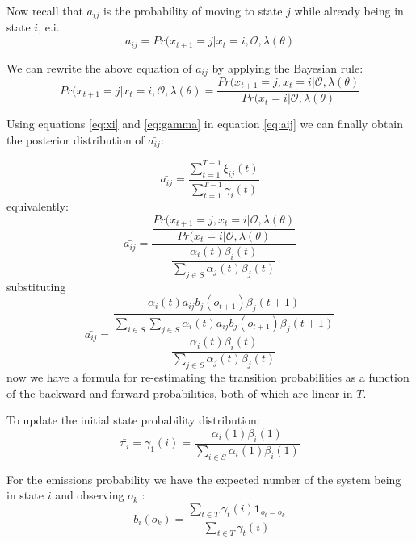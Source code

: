 \documentclass[a4paper,12pt]{article}
\theoremstyle{definition}
\begin{document}
Now recall that $a_{ij}$ is the probability of moving to state $j$ while already being in state $i$, e.i. 
\begin{equation}
a_{ij}= Pr(x_{t+1}=j|x_t=i, \mathcal{O}, \lambda(\theta)
\end{equation}


We can rewrite the above equation of $a_{ij}$  by applying the Bayesian rule:
\begin{equation}\label{eq:aij}
Pr(x_{t+1}=j|x_t=i, \mathcal{O}, \lambda(\theta) = \frac{Pr(x_{t+1}=j,x_t=i| \mathcal{O}, \lambda(\theta)}{Pr(x_t=i | \mathcal{O}, \lambda(\theta)}
\end{equation}

Using equations \ref{eq:xi} and \ref{eq:gamma} in equation \ref{eq:aij} we can finally obtain the posterior distribution of $\bar{a_{ij}}$:

\begin{equation}
\bar{a_{ij}} = \frac{\sum_{t=1}^{T-1}\xi_{ij}(t)}{\sum_{t=1}^{T-1} \gamma_i(t)} 
\end{equation}
equivalently:
\begin{equation}
\bar{a_{ij}} = \dfrac{\dfrac{Pr(x_{t+1}=j,x_t=i| \mathcal{O}, \lambda(\theta)}{Pr(x_t=i | \mathcal{O}, \lambda(\theta)}}
		 {\dfrac{\alpha_i(t) \beta_i(t)}{\sum_{j \in S}\alpha_j(t) \beta_j(t) }}
\end{equation}
substituting 
\begin{equation}
\bar{a_{ij}} = \dfrac{  \dfrac{\alpha_i(t) a_{ij} b_j(o_{t+1}) \beta_j(t+1)}
					{\sum_{i\in S}\sum_{j\in S} \alpha_i(t) a_{ij} b_j(o_{t+1}) \beta_j(t+1) }}
					{\dfrac{\alpha_i(t) \beta_i(t)}{\sum_{j \in S}\alpha_j(t) \beta_j(t) }}
\end{equation}
now we have a formula for re-estimating the transition probabilities as a function of the backward and forward probabilities, both of which are linear in $T$. 

To update the initial state probability distribution: 
\begin{equation}
\bar{\pi_i} = \gamma_1(i) = \frac{\alpha_i(1)\beta_i(1)}{\sum_{i \in S} \alpha_i(1)\beta_i(1) }
\end{equation}

For the emissions probability we have the expected number of the system being in state $i$ and observing $o_k$ :
\begin{equation}
\bar{b_i(o_k)} = \frac{\sum_{t \in T} \gamma_t(i) \mathbf{1}_{o_t=o_k}}{\sum_{t \in T} \gamma_t(i)}
\end{equation}
\end{document}

